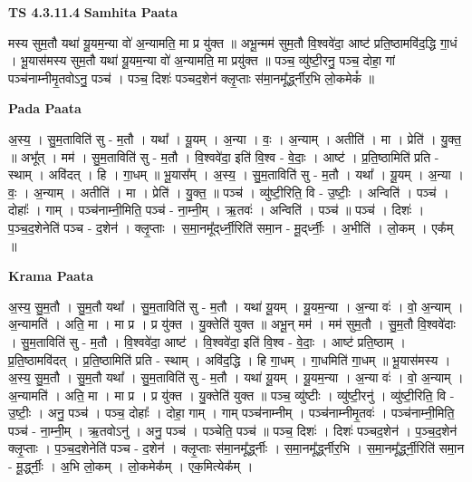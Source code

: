 \documentclass[17pt]{extarticle}
\begin{document}
\textbf{TS 4.3.11.4 } \newline
\textbf{Samhita Paata} \newline

मस्य सुम॒तौ यथा॑ यू॒यम॒न्या वो॑ अ॒न्यामति॒ मा प्र यु॑क्त ॥ अभू॒न्मम॑ सुम॒तौ वि॒श्ववे॑दा॒ आष्ट॑ प्रति॒ष्ठामवि॑द॒द्धि गा॒धं । भू॒यास॑मस्य सुम॒तौ यथा॑ यू॒यम॒न्या वो॑ अ॒न्यामति॒ मा प्रयु॑क्त ॥ पञ्च॒ व्यु॑ष्टी॒रनु॒ पञ्च॒ दोहा॒ गां पञ्च॑नाम्नीमृ॒तवोऽनु॒ पञ्च॑ । पञ्च॒ दिशः॑ पञ्चद॒शेन॑ क्लृ॒प्ताः स॑मा॒नमू᳚र्द्ध्नीर॒भि लो॒कमेकं᳚ ॥ \newline

\textbf{Pada Paata} \newline

अ॒स्य॒ । सु॒म॒ताविति॑ सु - म॒तौ । यथा᳚ । यू॒यम् । अ॒न्या । वः॒ । अ॒न्याम् । अतीति॑ । मा । प्रेति॑ । यु॒क्त॒ ॥ अभू᳚त् । मम॑ । सु॒म॒ताविति॑ सु - म॒तौ । वि॒श्ववे॑दा॒ इति॑ वि॒श्व - वे॒दाः॒ । आष्ट॑ । प्र॒ति॒ष्ठामिति॑ प्रति - स्थाम् । अवि॑दत् । हि । गा॒धम् ॥ भू॒यास᳚म् । अ॒स्य॒ । सु॒म॒ताविति॑ सु - म॒तौ । यथा᳚ । यू॒यम् । अ॒न्या । वः॒ । अ॒न्याम् । अतीति॑ । मा । प्रेति॑ । यु॒क्त॒ ॥ पञ्च॑ । व्यु॑ष्टी॒रिति॒ वि - उ॒ष्टीः॒ । अन्विति॑ । पञ्च॑ । दोहाः᳚ । गाम् । पञ्च॑नाम्नी॒मिति॒ पञ्च॑ - ना॒म्नी॒म् । ऋ॒तवः॑ । अन्विति॑ । पञ्च॑ ॥ पञ्च॑ । दिशः॑ । प॒ञ्च॒द॒शेनेति॑ पञ्च - द॒शेन॑ । क्लृ॒प्ताः । स॒मा॒नमू᳚द्‌र्ध्नी॒रिति॑ समा॒न - मू॒द्‌र्ध्नीः॒ । अ॒भीति॑ । लो॒कम् । एक᳚म् ॥  \newline


\textbf{Krama Paata} \newline

अ॒स्य॒ सु॒म॒तौ । सु॒म॒तौ यथा᳚ । सु॒म॒ताविति॑ सु - म॒तौ । यथा॑ यू॒यम् । यू॒यम॒न्या । अ॒न्या वः॑ । वो॒ अ॒न्याम् । अ॒न्यामति॑ । अति॒ मा । मा प्र । प्र यु॑क्त । यु॒क्तेति॑ युक्त ॥ अभू॒न् मम॑ । मम॑ सुम॒तौ । सु॒म॒तौ वि॒श्ववे॑दाः । सु॒म॒ताविति॑ सु - म॒तौ । वि॒श्ववे॑दा॒ आष्ट॑ । वि॒श्ववे॑दा॒ इति॑ वि॒श्व - वे॒दाः॒ । आष्ट॑ प्रति॒ष्ठाम् । प्र॒ति॒ष्ठामवि॑दत् । प्र॒ति॒ष्ठामिति॑ प्रति - स्थाम् । अवि॑द॒द्धि । हि गा॒धम् । गा॒धमिति॑ गा॒धम् ॥ भू॒यास॑मस्य । अ॒स्य॒ सु॒म॒तौ । सु॒म॒तौ यथा᳚ । सु॒म॒ताविति॑ सु - म॒तौ । यथा॑ यू॒यम् । यू॒यम॒न्या । अ॒न्या वः॑ । वो॒ अ॒न्याम् । अ॒न्यामति॑ । अति॒ मा । मा प्र । प्र यु॑क्त । यु॒क्तेति॑ युक्त ॥ पञ्च॒ व्यु॑ष्टीः । व्यु॑ष्टी॒रनु॑ । व्यु॑ष्टी॒रिति॒ वि - उ॒ष्टीः॒ । अनु॒ पञ्च॑ । पञ्च॒ दोहाः᳚ । दोहा॒ गाम् । गाम् पञ्च॑नाम्नीम् । पञ्च॑नाम्नीमृ॒तवः॑ । पञ्च॑नाम्नी॒मिति॒ पञ्च॑ - ना॒म्नी॒म् । ऋ॒तवोऽनु॑ । अनु॒ पञ्च॑ । पञ्चेति॒ पञ्च॑ ॥ पञ्च॒ दिशः॑ । दिशः॑ पञ्चद॒शेन॑ । प॒ञ्च॒द॒शेन॑ क्लृ॒प्ताः । प॒ञ्च॒द॒शेनेति॑ पञ्च - द॒शेन॑ । क्लृ॒प्ताः स॑मा॒नमू᳚र्द्ध्नीः । स॒मा॒नमू᳚र्द्ध्नीर॒भि । स॒मा॒नमू᳚र्द्ध्नी॒रिति॑ समा॒न - मू॒र्द्ध्नीः॒ । अ॒भि लो॒कम् । लो॒कमेक᳚म् । एक॒मित्येक᳚म् । \newline
\end{document}
